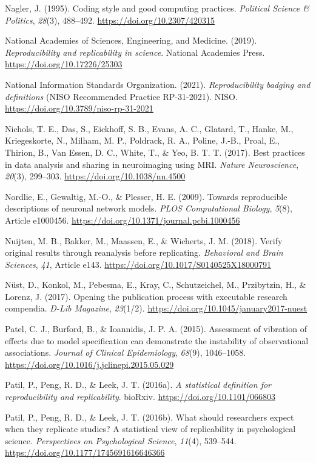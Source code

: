 \documentclass[authordate, meta]{jote-new-article}
\begin{document}
	Nagler, J. (1995). Coding style and good computing practices. \emph{Political Science \& Politics}, \emph{28}(3), 488--492. \url{https://doi.org/10.2307/420315}


	National Academies of Sciences, Engineering, and Medicine. (2019). \emph{Reproducibility and replicability in science}. National Academies Press. \url{https://doi.org/10.17226/25303}


	National Information Standards Organization. (2021). \emph{Reproducibility badging and definitions} (NISO Recommended Practice RP-31-2021). NISO. \url{https://doi.org/10.3789/niso-rp-31-2021}


	Nichols, T. E., Das, S., Eickhoff, S. B., Evans, A. C., Glatard, T., Hanke, M., Kriegeskorte, N., Milham, M. P., Poldrack, R. A., Poline, J.-B., Proal, E., Thirion, B., Van Essen, D. C., White, T., \& Yeo, B. T. T. (2017). Best practices in data analysis and sharing in neuroimaging using MRI. \emph{Nature Neuroscience}, \emph{20}(3), 299--303. \url{https://doi.org/10.1038/nn.4500}


	Nordlie, E., Gewaltig, M.-O., \& Plesser, H. E. (2009). Towards reproducible descriptions of neuronal network models. \emph{PLOS Computational Biology}, \emph{5}(8), Article e1000456. \url{https://doi.org/10.1371/journal.pcbi.1000456}


	Nuijten, M. B., Bakker, M., Maassen, E., \& Wicherts, J. M. (2018). Verify original results through reanalysis before replicating. \emph{Behavioral and Brain Sciences}, \emph{41}, Article e143. \url{https://doi.org/10.1017/S0140525X18000791}


	Nüst, D., Konkol, M., Pebesma, E., Kray, C., Schutzeichel, M., Przibytzin, H., \& Lorenz, J. (2017). Opening the publication process with executable research compendia. \emph{D-Lib Magazine}, \emph{23}(1/2). \url{https://doi.org/10.1045/january2017-nuest}


	Patel, C. J., Burford, B., \& Ioannidis, J. P. A. (2015). Assessment of vibration of effects due to model specification can demonstrate the instability of observational associations. \emph{Journal of Clinical Epidemiology}, \emph{68}(9), 1046--1058. \url{https://doi.org/10.1016/j.jclinepi.2015.05.029}


	Patil, P., Peng, R. D., \& Leek, J. T. (2016a). \emph{A statistical definition for reproducibility and replicability}. bioRxiv. \url{https://doi.org/10.1101/066803}


	Patil, P., Peng, R. D., \& Leek, J. T. (2016b). What should researchers expect when they replicate studies? A statistical view of replicability in psychological science. \emph{Perspectives on Psychological Science}, \emph{11}(4), 539--544. \url{https://doi.org/10.1177/1745691616646366}
\end{document}
